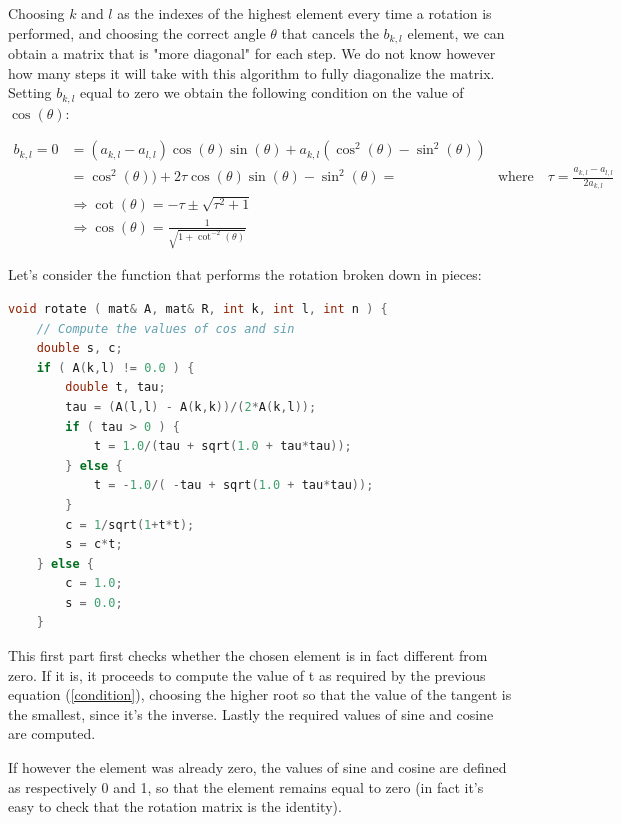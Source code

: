 \documentclass {article}
\begin{document}
Choosing $k$ and $l$ as the indexes of the highest element every time a rotation is performed, and choosing the correct angle $\theta$ that cancels the $b_{k, l}$ element, we can obtain a matrix that is "more diagonal" for each step. We do not know however how many steps it will take with this algorithm to fully diagonalize the matrix.
Setting $b_{k, l}$ equal to zero we obtain the following condition on the value of $\cos(\theta)$:

\begin{align}
b_{k, l}=0&=(a_{k, l}-a_{l, l} )\cos (\theta) \sin(\theta)+ a_{k, l}(\cos^2(\theta)- \sin^2 (\theta)) &\\
&=\cos^2 (\theta)) +2 \tau \cos(\theta) \sin( \theta)- \sin^2 (\theta)= & \mbox{where} \quad \tau=\frac{a_{k, l}-a_{l, l}}{2 a_{k, l} } \\
& \Longrightarrow \cot (\theta)=-\tau \pm \sqrt{\tau^2+1} &\\
& \Longrightarrow \cos(\theta) =\frac{1}{\sqrt{1+ \cot^{-2}(\theta)}} &
\label{condition}
\end{align}

Let's consider the function that performs the rotation broken down in pieces:
\begin{lstlisting}[language=cpp]
   void rotate ( mat& A, mat& R, int k, int l, int n ) {
    // Compute the values of cos and sin
    double s, c;
    if ( A(k,l) != 0.0 ) {
        double t, tau;
        tau = (A(l,l) - A(k,k))/(2*A(k,l));
        if ( tau > 0 ) {
            t = 1.0/(tau + sqrt(1.0 + tau*tau));
        } else {
            t = -1.0/( -tau + sqrt(1.0 + tau*tau));
        }
        c = 1/sqrt(1+t*t);
        s = c*t;
    } else {
        c = 1.0;
        s = 0.0;
    }   
\end{lstlisting}

This first part first checks whether the chosen element is in fact different from zero. If it is, it proceeds to compute the value of t as required by the previous equation (\ref{condition}), choosing the higher root so that the value of the tangent is the smallest, since it's the inverse. Lastly the required values of sine and cosine are computed.

If however the element was already zero, the values of sine and cosine are defined as respectively 0 and 1, so that the element remains equal to zero (in fact it's easy to check that the rotation matrix is the identity).
\end{document}
